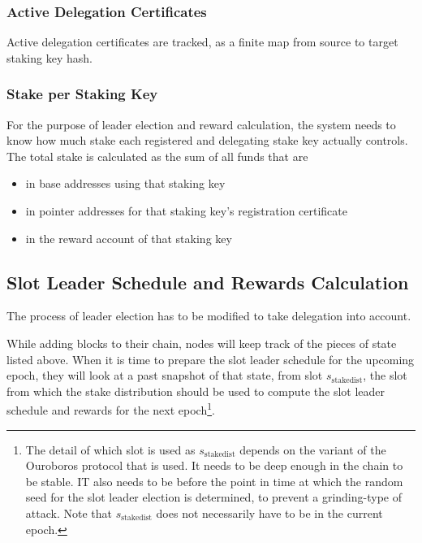 \documentclass[11pt,a4paper]{article}
\begin{document}
\subsubsection{Active Delegation Certificates}
\label{active-delegation-certificates}

Active delegation certificates are tracked, as a finite map from
source to target staking key hash.

\subsubsection{Stake per Staking Key}
\label{stake-per-staking-key}

For the purpose of leader election and reward calculation, the system
needs to know how much stake each registered and delegating stake key
actually controls. The total stake is calculated as the sum of all
funds that are
\begin{itemize}
\item in base addresses using that staking key
\item in pointer addresses for that staking key's registration
  certificate
\item in the reward account of that staking key
\end{itemize}

\subsection{Slot Leader Schedule and Rewards Calculation}
\label{slot-leader-schedule}

The process of leader election has to be modified to take delegation
into account.

While adding blocks to their chain, nodes will keep track of the
pieces of state listed above. When it is time to prepare the slot
leader schedule for the upcoming epoch, they will look at a past
snapshot of that state, from slot \(s_\text{stakedist}\), the slot
from which the stake distribution should be used to compute the slot
leader schedule and rewards for the next epoch\footnote{The detail of
  which slot is used as \(s_\text{stakedist}\) depends on the variant
  of the Ouroboros protocol that is used. It needs to be deep enough
  in the chain to be stable. IT also needs to be before the point in
  time at which the random seed for the slot leader election is
  determined, to prevent a grinding-type of attack. Note that
  \(s_\text{stakedist}\) does not necessarily have to be in the
  current epoch.}.
\end{document}
